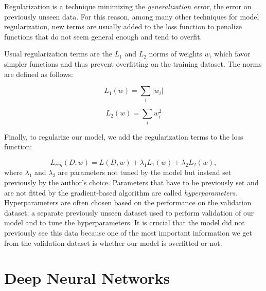 Regularization is a technique minimizing the \emph{generalization error}, the error on previously unseen data. For this reason, among many other techniques for model regularization, new terms are usually added to the loss function to penalize functions that do not seem general enough and tend to overfit.

Usual regularization terms are the $L_1$ and $L_2$ norms of weights $w$, which favor simpler functions and thus prevent overfitting on the training dataset. The norms are defined as follows:

\begin{equation}
L_1(w) = \sum_i |w_i|
\end{equation}

\begin{equation}
L_2(w) = \sum_i w_i^2
\end{equation}

Finally, to regularize our model, we add the regularization terms to the loss function:

\begin{equation}
L_{reg}(D, w) = L(D, w) + \lambda_1 L_1(w) + \lambda_2 L_2(w),
\end{equation}
where $\lambda_1$ and $\lambda_2$ are parameters not tuned by the model but instead set previously by the author’s choice. Parameters that have to be previously set and are not fitted by the gradient-based algorithm are called \emph{hyperparameters}. Hyperparameters are often chosen based on the performance on the validation dataset; a separate previously unseen dataset used to perform validation of our model and to tune the hyperparameters. It is crucial that the model did not previously see this data because one of the most important information we get from the validation dataset is whether our model is overfitted or not.


\section{Deep Neural Networks}

